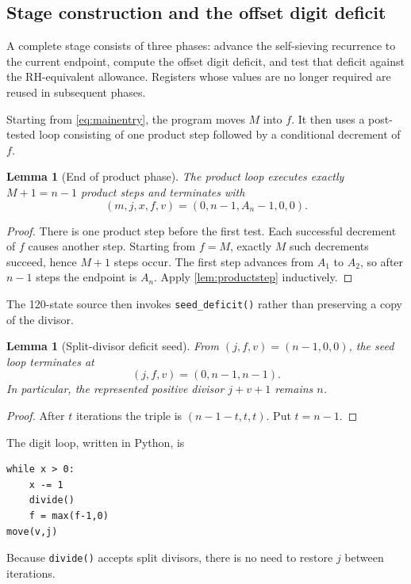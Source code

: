 \documentclass[10pt]{article}
\newtheorem{lemma}[theorem]{Lemma}
\theoremstyle{definition}
\begin{document}
\subsection{Stage construction and the offset digit deficit}

A complete stage consists of three phases: advance the self-sieving recurrence
to the current endpoint, compute the offset digit deficit, and test that
deficit against the RH-equivalent allowance. Registers whose values are no
longer required are reused in subsequent phases.

Starting from \eqref{eq:mainentry}, the program moves $M$ into $f$. It then
uses a post-tested loop consisting of one product step followed by a
conditional decrement of $f$.

\begin{lemma}[End of product phase]
\label{lem:productphase}
The product loop executes exactly $M+1=n-1$ product steps and terminates with
\[
(m,j,x,f,v)=(0,n-1,A_n-1,0,0).
\]
\end{lemma}

\begin{proof}
There is one product step before the first test. Each successful decrement of
$f$ causes another step. Starting from $f=M$, exactly $M$ such decrements
succeed, hence $M+1$ steps occur. The first step advances from $A_1$ to $A_2$,
so after $n-1$ steps the endpoint is $A_n$. Apply \cref{lem:productstep}
inductively.
\end{proof}

The 120-state source then invokes \texttt{seed\_deficit()} rather than
preserving a copy of the divisor.

\begin{lemma}[Split-divisor deficit seed]
\label{lem:seed}
From $(j,f,v)=(n-1,0,0)$, the seed loop terminates at
\[
(j,f,v)=(0,n-1,n-1).
\]
In particular, the represented positive divisor $j+v+1$ remains $n$.
\end{lemma}

\begin{proof}
After $t$ iterations the triple is $(n-1-t,t,t)$. Put $t=n-1$.
\end{proof}

The digit loop, written in Python, is
\begin{lstlisting}
while x > 0:
    x -= 1
    divide()
    f = max(f-1,0)
move(v,j)
\end{lstlisting}
Because \texttt{divide()} accepts split divisors, there is no need to restore
$j$ between iterations.
\end{document}

